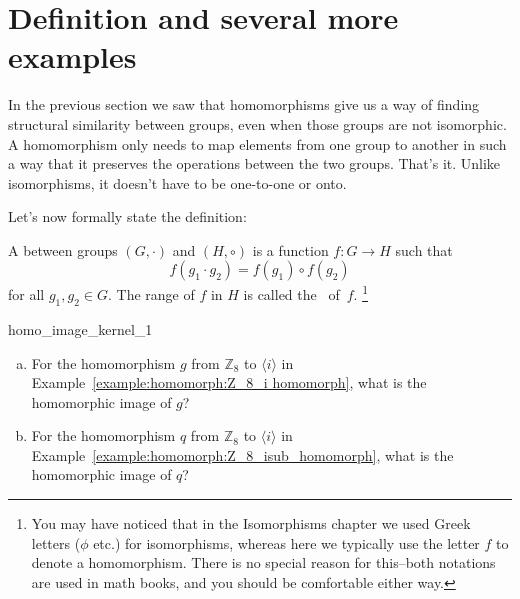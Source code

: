 \section{Definition and several more examples}\label{sec:homomorph:several}

In  the previous section we saw that homomorphisms give us a way of finding structural similarity between groups, even when those groups are not isomorphic.  A homomorphism only needs to  map elements from one group to another in such a way that it preserves the operations between the two groups.  That's it. Unlike isomorphisms, it doesn't have to be one-to-one or onto.  

Let's now formally state the definition:

\begin{defn} \label{homomorphism_def}
A
 between groups $(G, \cdot)$ and $(H, \circ)$ is a function $f :
G \rightarrow H$ such that  
\[
f( g_1 \cdot g_2 ) = f( g_1 ) \circ f( g_2 )
\]
for all $g_1, g_2 \in G$. The range of $f$ in $H$ is called the ~of~$f$.
\footnote{You may have noticed that in the Isomorphisms chapter we used Greek letters ($\phi$ etc.) for isomorphisms, whereas here we typically use the  letter $f$ to denote a homomorphism. There is no special reason for this--both notations are used in math books, and you should be comfortable either way.}
 \end{defn}

\begin{exercise}{homo_image_kernel_1}

\begin{enumerate}[(a)]
\item
For the homomorphism $g$ from ${\mathbb Z}_8$ to $\langle i \rangle$ in Example~\ref{example:homomorph:Z_8_i homomorph}, what is the homomorphic image of $g$?
\item
For the homomorphism $q$ from ${\mathbb Z}_8$ to $\langle i \rangle$ in Example~\ref{example:homomorph:Z_8_isub_homomorph}, what is the homomorphic image of $q$?
\end{enumerate}
\end{exercise}  
 
 
